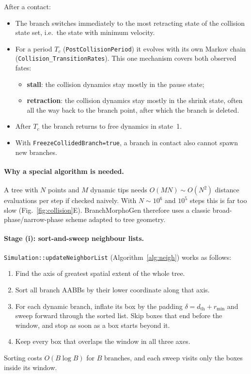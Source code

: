 \documentclass[11pt,a4paper]{article}
\newcommand{\code}[1]{\texttt{#1}}
\begin{document}
After a contact:
\begin{itemize}
  \item The branch switches immediately to the most retracting state of the collision state set, i.e.\ the state with minimum velocity.
  \item For a period $T_c$ (\code{PostCollisionPeriod}) it evolves with its own Markov chain (\code{Collision\_TransitionRates}). This one mechanism covers both observed fates:
  \begin{itemize}
    \item \textbf{stall}: the collision dynamics stay mostly in the pause state;
    \item \textbf{retraction}: the collision dynamics stay mostly in the shrink state, often all the way back to the branch point, after which the branch is deleted.
  \end{itemize}
  \item After $T_c$ the branch returns to free dynamics in state~1.
  \item With \code{FreezeCollidedBranch=true}, a branch in contact also cannot spawn new branches.
\end{itemize}

\paragraph{Why a special algorithm is needed.}
A tree with $N$ points and $M$ dynamic tips needs $O(MN)\sim O(N^2)$ distance evaluations per step if checked naively. With $N\sim10^6$ and $10^5$ steps this is far too slow (Fig.~\ref{fig:collision}E). BranchMorphoGen therefore uses a classic broad-phase/narrow-phase scheme adapted to tree geometry.

\paragraph{Stage (i): sort-and-sweep neighbour lists.}
\code{Simulation::updateNeighborList} (Algorithm~\ref{alg:neigh}) works as follows:
\begin{enumerate}
  \item Find the axis of greatest spatial extent of the whole tree.
  \item Sort all branch AABBs by their lower coordinate along that axis.
  \item For each dynamic branch, inflate its box by the padding $\delta=d_\text{th}+r_\text{min}$ and sweep forward through the sorted list. Skip boxes that end before the window, and stop as soon as a box starts beyond it.
  \item Keep every box that overlaps the window in all three axes.
\end{enumerate}
Sorting costs $O(B\log B)$ for $B$ branches, and each sweep visits only the boxes inside its window.
\end{document}
